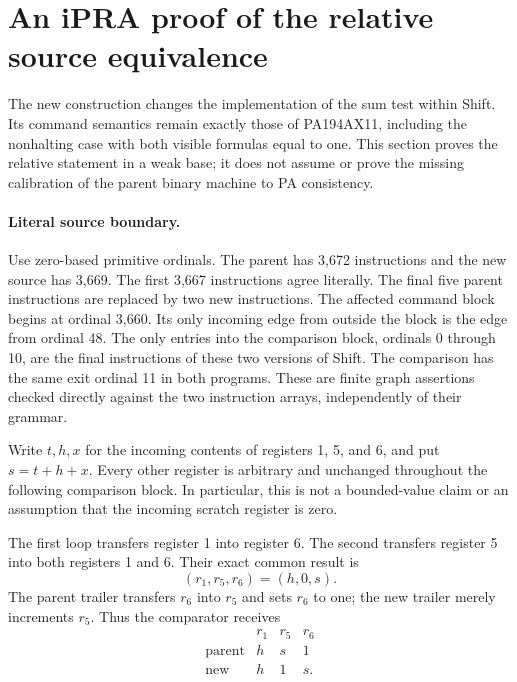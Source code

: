 \section{An iPRA proof of the relative source equivalence}
\label{sec:relative-ipra}

The new construction changes the implementation of the sum test within
Shift. Its command semantics remain exactly those of PA194AX11, including
the nonhalting case with both visible formulas equal to one. This section
proves the relative statement in a weak base; it does not assume or prove
the missing calibration of the parent binary machine to PA consistency.

\paragraph{Literal source boundary.}
Use zero-based primitive ordinals. The parent has 3,672 instructions and
the new source has 3,669. The first 3,667 instructions agree literally.
The final five parent instructions are replaced by two new instructions.
The affected command block begins at ordinal 3,660. Its only incoming edge
from outside the block is the edge from ordinal 48. The only entries into
the comparison block, ordinals 0 through 10, are the final instructions of
these two versions of Shift. The comparison has the same exit ordinal 11
in both programs. These are finite graph assertions checked directly
against the two instruction arrays, independently of their grammar.

Write $t,h,x$ for the incoming contents of registers 1, 5, and 6, and put
$s=t+h+x$. Every other register is arbitrary and unchanged throughout the
following comparison block. In particular, this is not a bounded-value
claim or an assumption that the incoming scratch register is zero.

The first loop transfers register 1 into register 6. The second transfers
register 5 into both registers 1 and 6. Their exact common result is
\[
                  (r_1,r_5,r_6)=(h,0,s).
\]
The parent trailer transfers $r_6$ into $r_5$ and sets $r_6$ to one; the
new trailer merely increments $r_5$. Thus the comparator receives
\[
 \begin{array}{c|ccc}
 &r_1&r_5&r_6\\\hline
 \text{parent}&h&s&1\\
 \text{new}&h&1&s.
 \end{array}
\]

